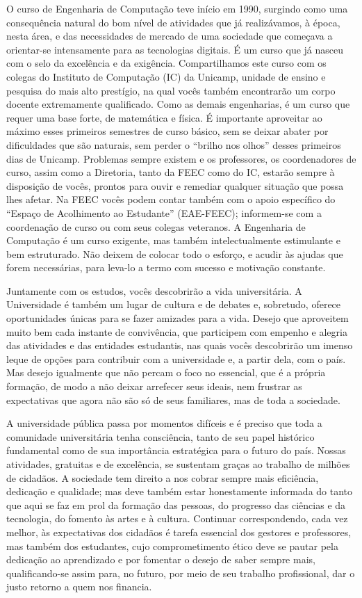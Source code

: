 O curso de Engenharia de Computação teve início em 1990, surgindo como uma
consequência natural do bom nível de atividades que já realizávamos, à época,
nesta área, e das necessidades de mercado de uma sociedade que começava a
orientar-se intensamente para as tecnologias digitais. É um curso que já nasceu
com o selo da excelência e da exigência. Compartilhamos este curso com os
colegas do Instituto de Computação (IC) da Unicamp, unidade de ensino e
pesquisa do mais alto prestígio, na qual vocês também encontrarão um corpo
docente extremamente qualificado. Como as demais engenharias, é um curso que
requer uma base forte, de matemática e física. É importante aproveitar ao
máximo esses primeiros semestres de curso básico, sem se deixar abater por
dificuldades que são naturais, sem perder o ``brilho nos olhos'' desses
primeiros dias de Unicamp. Problemas sempre existem e os professores, os
coordenadores de curso, assim como a Diretoria, tanto da FEEC como do IC,
estarão sempre à disposição de vocês, prontos para ouvir e remediar qualquer
situação que possa lhes afetar. Na FEEC vocês podem contar também com o apoio
específico do ``Espaço de Acolhimento ao Estudante'' (EAE-FEEC); informem-se
com a coordenação de curso ou com seus colegas veteranos. A Engenharia de
Computação é um curso exigente, mas também intelectualmente estimulante e bem
estruturado. Não deixem de colocar todo o esforço, e acudir às ajudas que forem
necessárias, para leva-lo a termo com sucesso e motivação constante.

Juntamente com os estudos, vocês descobrirão a vida universitária. A
Universidade é também um lugar de cultura e de debates e, sobretudo, oferece
oportunidades únicas para se fazer amizades para a vida. Desejo que aproveitem
muito bem cada instante de convivência, que participem com empenho e alegria
das atividades e das entidades estudantis, nas quais vocês descobrirão um
imenso leque de opções para contribuir com a universidade e, a partir dela, com
o país. Mas desejo igualmente que não percam o foco no essencial, que é a
própria formação, de modo a não deixar arrefecer seus ideais, nem frustrar as
expectativas que agora não são só de seus familiares, mas de toda a sociedade.

A universidade pública passa por momentos difíceis e é preciso que toda a
comunidade universitária tenha consciência, tanto de seu papel histórico
fundamental como de sua importância estratégica para o futuro do país. Nossas
atividades, gratuitas e de excelência, se sustentam graças ao trabalho de
milhões de cidadãos. A sociedade tem direito a nos cobrar sempre mais
eficiência, dedicação e qualidade; mas deve também estar honestamente informada
do tanto que aqui se faz em prol da formação das pessoas, do progresso das
ciências e da tecnologia, do fomento às artes e à cultura. Continuar
correspondendo, cada vez melhor, às expectativas dos cidadãos é tarefa
essencial dos gestores e professores, mas também dos estudantes, cujo
comprometimento ético deve se pautar pela dedicação ao aprendizado e por
fomentar o desejo de saber sempre mais, qualificando-se assim para, no futuro,
por meio de seu trabalho profissional, dar o justo retorno a quem nos financia.

